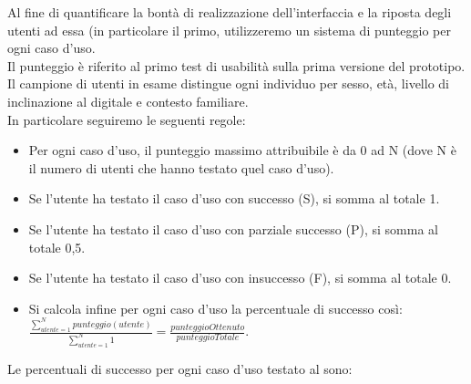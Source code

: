             Al fine di quantificare la bontà di realizzazione dell'interfaccia e la riposta degli utenti ad essa (in particolare il primo, utilizzeremo un sistema di punteggio per ogni caso d'uso. \\
            Il punteggio è riferito al primo test di usabilità sulla prima versione del prototipo. \\
            Il campione di utenti in esame distingue ogni individuo per sesso, età, livello di inclinazione al digitale e contesto familiare. \\
            In particolare seguiremo le seguenti regole:
            \begin{itemize}
                \item Per ogni caso d'uso, il punteggio massimo attribuibile è da 0 ad N (dove N è il numero di utenti che hanno testato quel caso d'uso).
                \item Se l'utente ha testato il caso d'uso con successo (S), si somma al totale 1.
                \item Se l'utente ha testato il caso d'uso con parziale successo (P), si somma al totale 0,5.
                \item Se l'utente ha testato il caso d'uso con insuccesso (F), si somma al totale 0.
                \item Si calcola infine per ogni caso d'uso la percentuale di successo così: \\ $\displaystyle\frac{\sum_{utente = 1} ^{N}punteggio(utente)}{\sum_{utente = 1} ^{N}1} = \frac{punteggioOttenuto}{punteggioTotale}$.
            \end{itemize}
            Le percentuali di successo per ogni caso d'uso testato al sono:
